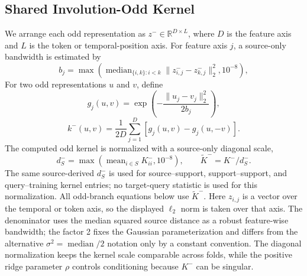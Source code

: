 \documentclass[preprint,12pt]{elsarticle}
\begin{document}
\subsection{Shared Involution-Odd Kernel}
We arrange each odd representation as $z^-\in\mathbb{R}^{D\times L}$, where $D$ is the feature axis and $L$ is the token or temporal-position axis. For feature axis $j$, a source-only bandwidth is estimated by
\begin{equation}
b_j=\max\left(\operatorname{median}_{\{i,k\}:i<k}\|z^-_{i,j}-z^-_{k,j}\|_2^2,10^{-8}\right),
\end{equation}
For two odd representations $u$ and $v$, define
\begin{equation}
g_j(u,v)=\exp\left(-\frac{\|u_j-v_j\|_2^2}{2b_j}\right),
\end{equation}
\begin{equation}
k^-(u,v)=\frac{1}{2D}\sum_{j=1}^{D}\left[g_j(u,v)-g_j(u,-v)\right].
\end{equation}
The computed odd kernel is normalized with a source-only diagonal scale,
\begin{equation}
d^-_S=\max\left(\operatorname{mean}_{i\in S}K^-_{ii},10^{-8}\right),
\qquad
\widetilde K^-=K^-/d^-_S.
\end{equation}
The same source-derived $d^-_S$ is used for source--support, support--support,
and query--training kernel entries; no target-query statistic is used for this
normalization. All odd-branch equations below use $\widetilde K^-$. Here $z_{i,j}$ is a vector over the temporal or token axis, so the displayed $\ell_2$ norm is taken over that axis. The denominator uses the median squared source distance as a robust feature-wise bandwidth; the factor 2 fixes the Gaussian parameterization and differs from the alternative $\sigma^2=\operatorname{median}/2$ notation only by a constant convention. The diagonal normalization keeps the kernel scale comparable across folds, while the positive ridge parameter $\rho$ controls conditioning because $K^-$ can be singular.
\end{document}
